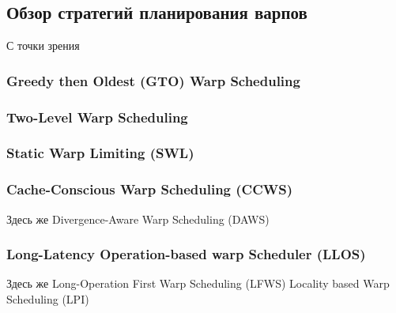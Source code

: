 \subsection{Обзор стратегий планирования варпов}

С точки зрения

\subsubsection{Greedy then Oldest (GTO) Warp Scheduling}


\subsubsection{Two-Level Warp Scheduling}


\subsubsection{Static Warp Limiting (SWL)}


\subsubsection{Cache-Conscious Warp Scheduling (CCWS)}

Здесь же Divergence-Aware Warp Scheduling (DAWS)

\subsubsection{Long-Latency Operation-based warp Scheduler (LLOS)}

Здесь же Long-Operation First Warp Scheduling (LFWS) Locality based Warp Scheduling (LPI)

